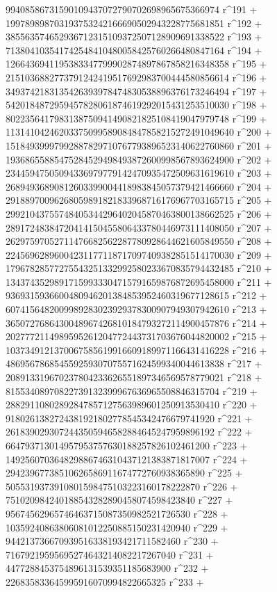        99408586731590109437072790702698965675366974 r^191 + 
       199789898703193753242166690502943228775681851 r^192 + 
       385563574652936712315109372507128909691338522 r^193 + 
       713804103541742548410480058425760266480847164 r^194 + 
       1266436941195383347799902874897867858216348358 r^195 + 
       2151036882773791242419517692983700444580856614 r^196 + 
       3493742183135426393978474830538896376173246494 r^197 + 
       5420184872959457828061874619292015431253510030 r^198 + 
       8022356417983138750941490821825108419047979748 r^199 + 
       11314104246203375099589084847858215272491049640 r^200 + 
       15184939997992887829710767793896523140622760860 r^201 + 
       19368655885475284529498493872600998567893624900 r^202 + 
       23445947505094336979779142470935472509631619610 r^203 + 
       26894936890812603399004418983845057379421466660 r^204 + 
       29188970096268059891821833968716176967703165715 r^205 + 
       29921043755748405344296402045870463800138662525 r^206 + 
       28917248384720414150455806433780446973111408050 r^207 + 
       26297597052711476682562287780928644621605849550 r^208 + 
       22456962896004231177118717097409382851514170030 r^209 + 
       17967828577275543251332992580233670835794432485 r^210 + 
       13437435298917159933304715791659876872695458000 r^211 + 
       9369315936600480946201384853952460319677128615 r^212 + 
       6074156482009989283023929378300907949307942610 r^213 + 
       3650727686430048967426810184793272114900457876 r^214 + 
       2027772114989595261204772443731703676044820002 r^215 + 
       1037349121370067585619916609189971166431416228 r^216 + 
       486956786854559259307075571624599340044613838 r^217 + 
       208913319670237804233626551897346569578779021 r^218 + 
       81553408970822739132399967636965508846315704 r^219 + 
       28829110802892847857127563989601250913530410 r^220 + 
       9180261382724381921802778545342476679741920 r^221 + 
       2618390293072443505946582884645247959896192 r^222 + 
       664793713014957953757630188257826102461200 r^223 + 
       149256070364829886746310437121383871817007 r^224 + 
       29423967738510626586911674772760938365890 r^225 + 
       5055319373910801598475103223160178222870 r^226 + 
       751020984240188543282890458074598423840 r^227 + 
       95674562965746463715087350982521726530 r^228 + 
       10359240863806081012250885150231420940 r^229 + 
       944213736670939516338193421711582460 r^230 + 
       71679219595695274643214082217267040 r^231 + 
       4477288453754896131539351185683900 r^232 + 
       226835833645995916070994822665325 r^233 + 
